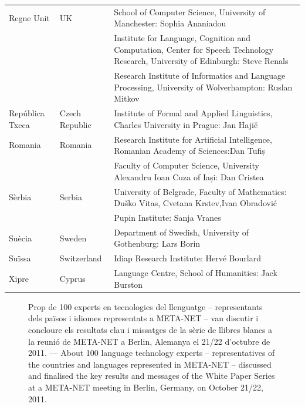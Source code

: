 \begin{multicols}{2}
\begin{itemize}
\begin{longtable}{@{}llp{113mm}@{}}
  Regne Unit & \textcolor{grey1}{UK} & 
  School of Computer Science, University of Manchester: Sophia Ananiadou \\ \addlinespace 
  & & Institute for Language, Cognition and Computation, Center for Speech Technology Research, University of Edinburgh: Steve Renals \\ \addlinespace 
  & & Research Institute of Informatics and Language Processing, University of Wolverhampton: Ruslan Mitkov \\ \addlinespace 
  República Txeca & \textcolor{grey1}{Czech Republic} & Institute of Formal and Applied Linguistics, Charles University in Prague: Jan Hajič \\ \addlinespace
  Romania & \textcolor{grey1}{Romania} & Research Institute for Artificial Intelligence, Romanian Academy of Sciences:\newline Dan Tufiș \\ \addlinespace
  & & Faculty of Computer Science, University Alexandru Ioan Cuza of Iași: Dan Cristea \\ \addlinespace
  Sèrbia & \textcolor{grey1}{Serbia} & University of Belgrade, Faculty of Mathematics: Duško Vitas, Cvetana Krstev,\newline Ivan Obradović \\ \addlinespace
  & & Pupin Institute: Sanja Vranes \\ \addlinespace  
  Suècia & \textcolor{grey1}{Sweden} & Department of Swedish, University of Gothenburg: Lars Borin \\ \addlinespace 
  Suïssa & \textcolor{grey1}{Switzerland} & Idiap Research Institute: Hervé Bourlard \\ \addlinespace 
  Xipre & \textcolor{grey1}{Cyprus} & Language Centre, School of Humanities: Jack Burston
\end{longtable}
\normalsize

\renewcommand*{\figureformat}{}
\renewcommand*{\captionformat}{}

\begin{figure}[htbp]
  \center
  \caption{Prop de 100 experts en tecnologies del llenguatge -- representants dels països i idiomes representats a META-NET --  van discutir i concloure els resultats clau i missatges de la sèrie de llibres blancs a la reunió de META-NET a Berlin, Alemanya el 21/22 d'octubre de 2011. ---
 \textcolor{grey1}{About 100 language technology experts -- representatives of the countries and languages represented in META-NET -- discussed and finalised the key results and messages of the White Paper Series at a META-NET meeting in Berlin, Germany, on October 21/22, 2011.}}
  \medskip
\end{figure}


\end{itemize}
\end{multicols}
